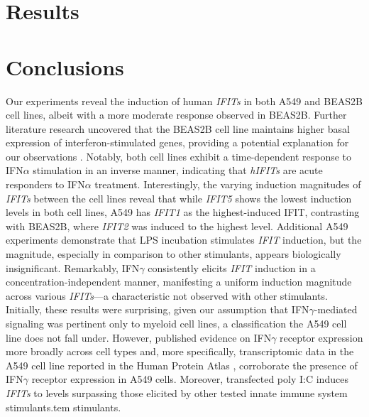 \section{Results} \label{sec:Results-Chapter 1}


\section{Conclusions} \label{sec:Conclusions Chapter 1}
Our experiments reveal the induction of human \textit{IFITs} in both A549 and BEAS2B cell lines, albeit with a more moderate response observed in BEAS2B. Further literature research uncovered that the BEAS2B cell line maintains higher basal expression of interferon-stimulated genes, providing a potential explanation for our observations \cite{Seng2014HighResistance}. Notably, both cell lines exhibit a time-dependent response to IFN\(\alpha\) stimulation in an inverse manner, indicating that \textit{hIFITs} are acute responders to IFN\(\alpha\) treatment. Interestingly, the varying induction magnitudes of \textit{IFITs} between the cell lines reveal that while \textit{IFIT5} shows the lowest induction levels in both cell lines, A549 has \textit{IFIT1} as the highest-induced IFIT, contrasting with BEAS2B, where \textit{IFIT2} was induced to the highest level. Additional A549 experiments demonstrate that LPS incubation stimulates \textit{IFIT} induction, but the magnitude, especially in comparison to other stimulants, appears biologically insignificant. Remarkably, IFN\(\gamma\) consistently elicits \textit{IFIT} induction in a concentration-independent manner, manifesting a uniform induction magnitude across various \textit{IFITs}—a characteristic not observed with other stimulants. Initially, these results were surprising, given our assumption that IFN\(\gamma\)-mediated signaling was pertinent only to myeloid cell lines, a classification the A549 cell line does not fall under. However, published evidence on IFN\(\gamma\) receptor expression more broadly across cell types \cite{Ivashkiv2018IFN:Immunotherapy} and, more specifically, transcriptomic data in the A549 cell line reported in the Human Protein Atlas \cite{Uhlen2015Tissue-basedProteome}, corroborate the presence of IFN\(\gamma\) receptor expression in A549 cells. Moreover, transfected poly I:C induces \textit{IFITs} to levels surpassing those elicited by other tested innate immune system stimulants.tem stimulants.

